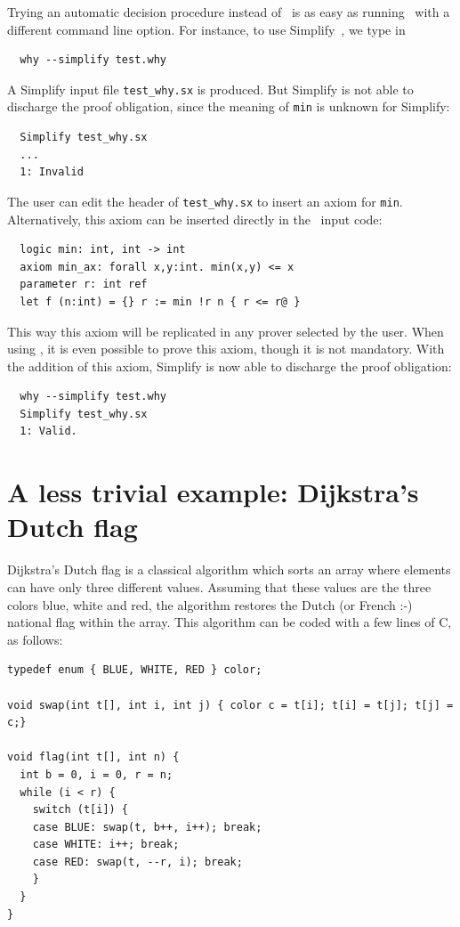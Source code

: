 \documentclass[a4paper,12pt]{report}
\begin{document}
Trying an automatic decision procedure instead of \coq\ is as easy as
running \why\ with a different command line option. For instance, to
use Simplify~\cite{Simplify}, we type in
\begin{verbatim}
  why --simplify test.why
\end{verbatim}
A Simplify input file \texttt{test\_why.sx} is produced. But Simplify
is not able to discharge the proof obligation, since the meaning of
\texttt{min} is unknown for Simplify:
\begin{verbatim}
  Simplify test_why.sx
  ...
  1: Invalid
\end{verbatim}
The user can edit the header of \texttt{test\_why.sx} to insert an
axiom for \texttt{min}. Alternatively, this axiom can be inserted
directly in the \why\ input code:
\begin{verbatim}
  logic min: int, int -> int
  axiom min_ax: forall x,y:int. min(x,y) <= x
  parameter r: int ref
  let f (n:int) = {} r := min !r n { r <= r@ }
\end{verbatim}
This way this axiom will be replicated in any prover selected by the
user. When using \coq, it is even possible to prove this axiom, though
it is not mandatory. With the addition of this axiom,
Simplify is now able to discharge the proof obligation:
\begin{verbatim}
  why --simplify test.why
  Simplify test_why.sx
  1: Valid.
\end{verbatim}

\section{A less trivial example: Dijkstra's Dutch flag}

Dijkstra's Dutch flag is a classical algorithm which sorts an array
where elements can have only three different values. Assuming that
these values are the three colors blue, white and red, the algorithm
restores the Dutch (or French :-) national flag within the array.
This algorithm can be coded with a few lines of C, as follows:
\begin{verbatim}
typedef enum { BLUE, WHITE, RED } color;

void swap(int t[], int i, int j) { color c = t[i]; t[i] = t[j]; t[j] = c;}

void flag(int t[], int n) {
  int b = 0, i = 0, r = n;
  while (i < r) {
    switch (t[i]) {
    case BLUE: swap(t, b++, i++); break;        
    case WHITE: i++; break;
    case RED: swap(t, --r, i); break;
    }
  }
}
\end{verbatim}
\end{document}

